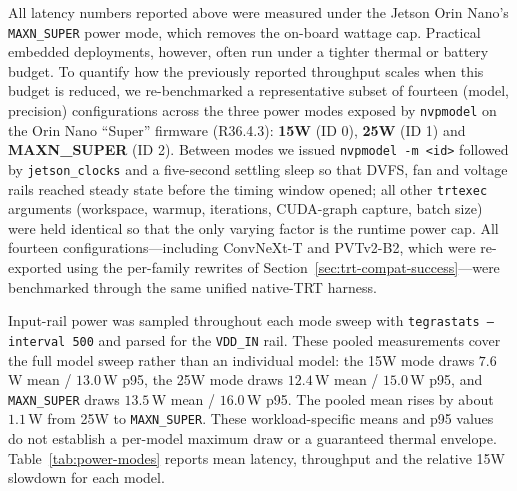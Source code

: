 \documentclass[runningheads,a4paper]{llncs}
\begin{document}
All latency numbers reported above were measured under the Jetson Orin Nano's \texttt{MAXN\_SUPER} power mode, which removes the on-board wattage cap. Practical embedded deployments, however, often run under a tighter thermal or battery budget. To quantify how the previously reported throughput scales when this budget is reduced, we re-benchmarked a representative subset of fourteen (model, precision) configurations across the three power modes exposed by \texttt{nvpmodel} on the Orin Nano ``Super'' firmware (R36.4.3): \textbf{15W} (ID 0), \textbf{25W} (ID 1) and \textbf{MAXN\_SUPER} (ID 2). Between modes we issued \texttt{nvpmodel -m <id>} followed by \texttt{jetson\_clocks} and a five-second settling sleep so that DVFS, fan and voltage rails reached steady state before the timing window opened; all other \texttt{trtexec} arguments (workspace, warmup, iterations, CUDA-graph capture, batch size) were held identical so that the only varying factor is the runtime power cap. All fourteen configurations---including ConvNeXt-T and PVTv2-B2, which were re-exported using the per-family rewrites of Section~\ref{sec:trt-compat-success}---were benchmarked through the same unified native-TRT harness.

Input-rail power was sampled throughout each mode sweep with \texttt{tegrastats --interval 500} and parsed for the \texttt{VDD\_IN} rail. These pooled measurements cover the full model sweep rather than an individual model: the 15W mode draws $7.6$\,W mean / $13.0$\,W p95, the 25W mode draws $12.4$\,W mean / $15.0$\,W p95, and \texttt{MAXN\_SUPER} draws $13.5$\,W mean / $16.0$\,W p95. The pooled mean rises by about $1.1$\,W from 25W to \texttt{MAXN\_SUPER}. These workload-specific means and p95 values do not establish a per-model maximum draw or a guaranteed thermal envelope.
Table~\ref{tab:power-modes} reports mean latency, throughput and the relative 15W slowdown for each model.
\end{document}
